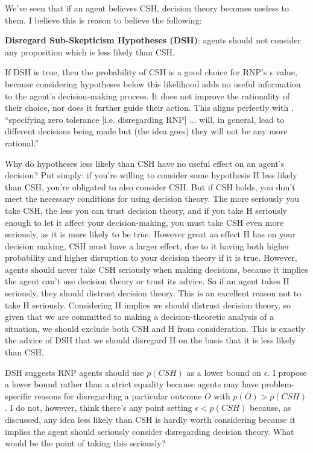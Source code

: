 \documentclass{article}
\begin{document}
We've seen that if an agent believes CSH, decision theory becomes useless to them. I believe this is reason to believe the following:

\textbf{Disregard Sub-Skepticism Hypotheses (DSH)}: agents should not consider any proposition which is less likely than CSH.

If DSH is true, then the probability of CSH is a good choice for RNP's \(\epsilon\) value, because considering hypotheses below this likelihood adds no useful information to the agent's decision-making process. It does not improve the rationality of their choice, nor does it further guide their action. This aligns perfectly with \citet[pg. 475]{smith2014evaluative}, ``specifying zero tolerance [i.e. disregarding RNP] ... will, in general, lead to different decisions being made \textemdash{} but (the idea goes) they will not be any more rational.''

Why do hypotheses less likely than CSH have no useful effect on an agent's decision? Put simply: if you're willing to consider some hypothesis H less likely than CSH, you're obligated to also consider CSH. But if CSH holds, you don't meet the necessary conditions for using decision theory. The more seriously you take CSH, the less you can trust decision theory, and if you take H seriously enough to let it affect your decision-making, you must take CSH even more seriously, as it is more likely to be true. However great an effect H has on your decision making, CSH must have a larger effect, due to it having both higher probability and higher disruption to your decision theory if it is true. However, agents should never take CSH seriously when making decisions, because it implies the agent can't use decision theory or trust its advice. So if an agent takes H seriously, they should distrust decision theory. This is an excellent reason not to take H seriously. Considering H implies we should distrust decision theory, so given that we are committed to making a decision-theoretic analysis of a situation, we should exclude both CSH and H from consideration. This is exactly the advice of DSH \textemdash{} that we should disregard H on the basis that it is less likely than CSH. 

DSH suggests RNP agents should use \(p(CSH)\) as a lower bound on \(\epsilon\). I propose a lower bound rather than a strict equality because agents may have problem-specific reasons for disregarding a particular outcome \(O\) with \(p(O)>p(CSH)\). I do not, however, think there's any point setting \(\epsilon < p(CSH)\) because, as discussed, any idea less likely than CSH is hardly worth considering because it implies the agent should seriously consider disregarding decision theory. What would be the point of taking this seriously?
\end{document}
